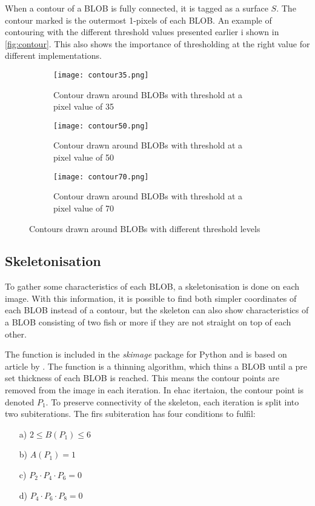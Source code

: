 When a contour of a BLOB is fully connected, it is tagged as a surface $ S $. The contour marked is the outermost 1-pixels of each BLOB. An example of contouring with the different threshold values presented earlier i shown in \autoref{fig:contour}. This also shows the importance of thresholding at the right value for different implementations.

\begin{figure}[H]
	\centering
	\begin{subfigure}[b]{0.3\textwidth}
		\texttt{[image: contour35.png]}
		\caption{Contour drawn around BLOBs with threshold at a pixel value of 35}
		\label{fig:thresh35}
	\end{subfigure}
	\begin{subfigure}[b]{0.3\textwidth}
		\texttt{[image: contour50.png]}
		\caption{Contour drawn around BLOBs with threshold at a pixel value of 50}
		\label{fig:thresh50}
	\end{subfigure}
	\begin{subfigure}[b]{0.3\textwidth}
		\texttt{[image: contour70.png]}
		\caption{Contour drawn around BLOBs with threshold at a pixel value of 70}
		\label{fig:thresh70}
	\end{subfigure}
	\caption{Contours drawn around BLOBs with different threshold levels}
	\label{fig:contour}
\end{figure}

\subsection{Skeletonisation}
To gather some characteristics of each BLOB, a skeletonisation is done on each image. With this information, it is possible to find both simpler coordinates of each BLOB instead of a contour, but the skeleton can also show characteristics of a BLOB consisting of two fish or more if they are not straight on top of each other.

The function is included in the \textit{skimage} package for Python and is based on article by \cite{Zhang1984}. The function is a thinning algorithm, which thins a BLOB until a pre set thickness of each BLOB is reached. This means the contour points are removed from the image in each iteration. In ehac itertaion, the contour point is denoted $P_1$. 
To preserve connectivity of the skeleton, each iteration is split into two subiterations. The firs subiteration has four conditions to fulfil:

\begin{itemize}
	\item[a)] $ 2 \leq B(P_1) \leq 6 $
	\item[b)] $ A(P_1) = 1 $
	\item[c)] $ P_2 \cdot P_4 \cdot P_6 = 0 $
	\item[d)] $ P_4 \cdot P_6 \cdot P_8 = 0 $
\end{itemize}

